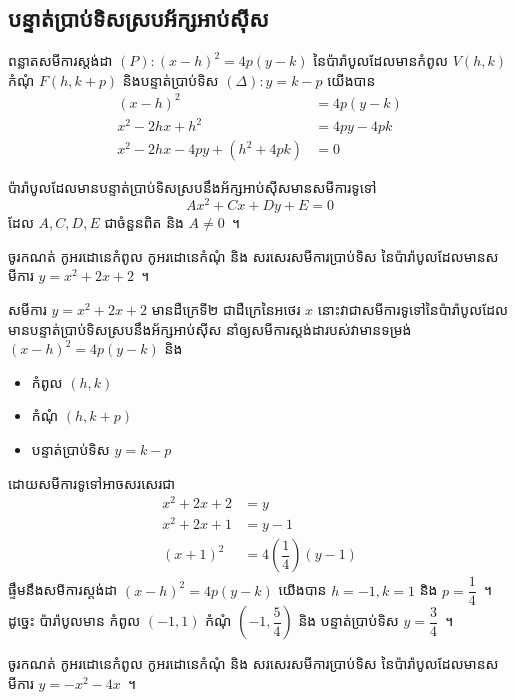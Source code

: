 \subsection{បន្ទាត់ប្រាប់ទិសស្របអ័ក្សអាប់ស៊ីស}
ពន្លាតសមីការស្ដង់ដា $ (P):(x-h)^2=4p(y-k) $ នៃប៉ារ៉ាបូលដែលមានកំពូល $ V(h,k) $ កំណុំ $ F(h,k+p) $ និងបន្ទាត់ប្រាប់ទិស $ (\Delta):y=k-p $ យើងបាន
\begin{align*}
	(x-h)^2 &=4p(y-k)\\
	x^2-2hx+h^2 &= 4py-4pk\\
	x^2-2hx-4py+(h^2+4pk) &=0
\end{align*}
%
\begin{proposition*}
	ប៉ារ៉ាបូលដែលមានបន្ទាត់ប្រាប់ទិសស្របនឹងអ័ក្សអាប់ស៊ីសមានសមីការទូទៅ
	\begin{equation}
		Ax^2+Cx+Dy+E=0
	\end{equation}
	ដែល $ A,C,D,E $ ជាចំនួនពិត និង $ A\neq 0 $~។
\end{proposition*}
%
\begin{example*}
	ចូរកណត់ កូអរដោនេ​កំពូល កូអរដោនេ​កំណុំ និង សរសេរសមីការប្រាប់ទិស នៃប៉ារ៉ាបូលដែលមានសមីការ $ y=x^2+2x+2 $~។
\end{example*}
%
\begin{answer}
	សមីការ $ y=x^2+2x+2 $ មានដឺក្រេទី២ ជាដឺក្រេនៃអថេរ $ x $ នោះវាជាសមីការទូទៅនៃប៉ារ៉ាបូលដែលមានបន្ទាត់ប្រាប់ទិសស្របនឹងអ័ក្សអាប់ស៊ីស នាំឲ្យសមីការស្តង់ដារបស់វាមានទម្រង់ $ (x-h)^2=4p(y-k) $ និង
	\begin{itemize}
		\item កំពូល $ (h,k) $
		\item កំណុំ $ (h,k+p) $
		\item បន្ទាត់ប្រាប់ទិស $ y=k-p $
	\end{itemize}
	ដោយសមីការទូទៅអាចសរសេរជា
	\begin{align*}
		x^2+2x+2 &=y\\
		x^2+2x+1 &=y-1\\
		(x+1)^2 &=4\left(\dfrac{1}{4}\right)(y-1)
	\end{align*}
	ផ្ទឹមនឹងសមីការស្តង់ដា $ (x-h)^2=4p(y-k) $ យើងបាន $ h=-1,k=1 $ និង $ p=\dfrac{1}{4} $~។ ដូច្នេះ ប៉ារ៉ាបូលមាន​ កំពូល $ (-1,1) $ កំណុំ $ \left(-1,\dfrac{5}{4}\right) $ និង បន្ទាត់ប្រាប់ទិស $ y=\dfrac{3}{4} $~។
\end{answer}
%
\begin{example*}
	ចូរកណត់ កូអរដោនេ​កំពូល កូអរដោនេ​កំណុំ និង សរសេរសមីការប្រាប់ទិស នៃប៉ារ៉ាបូលដែលមានសមីការ $ y=-x^2-4x $~។
\end{example*}
%
